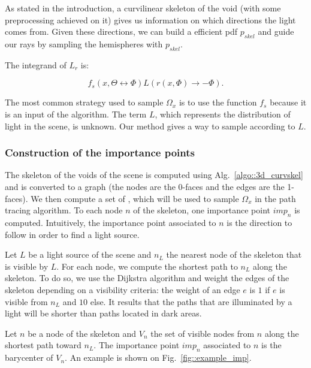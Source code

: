 As stated in the introduction, a curvilinear skeleton of the void (with some preprocessing achieved on it) gives us information on which directions the light comes from. Given these directions, we can build a efficient pdf $p_{skel}$ and guide our rays by sampling the hemispheres with $p_{skel}$.

The integrand of $L_r$ is:

\begin{equation*}
f_s(x, \Theta \leftrightarrow \Phi) L(r(x, \Phi) \rightarrow -\Phi).
\end{equation*}

The most common strategy used to sample $\Omega_x$ is to use the function $f_s$ because it is an input of the algorithm.
The term $L$, which represents the distribution of light in the scene, is unknown. Our method gives a way to sample according to $L$.


\subsubsection{Construction of the importance points}

The skeleton of the voids of the scene is computed using Alg.~\ref{algo::3d_curvskel} and is converted to a graph (the nodes are the 0-faces and the edges are the 1-faces). We then compute a set of , which will be used to sample $\Omega_x$ in the path tracing algorithm. To each node $n$ of the skeleton, one importance point $imp_n$ is computed. Intuitively, the importance point associated to $n$ is the direction to follow in order to find a light source.

Let $L$ be a light source of the scene and $n_L$ the nearest node of the skeleton that is visible by $L$. For each node, we compute the shortest path to $n_L$ along the skeleton. To do so, we use the Dijkstra algorithm and weight the edges of the skeleton depending on a visibility criteria: the weight of an edge $e$ is $1$ if $e$ is visible from $n_L$ and $10$ else. It results that the paths that are illuminated by a light will be shorter than paths located in dark areas.

Let $n$ be a node of the skeleton and $V_n$ the set of visible nodes from $n$ along the shortest path toward $n_L$. The importance point $imp_n$ associated to $n$ is the barycenter of $V_n$. An example is shown on Fig.~\ref{fig::example_imp}.


